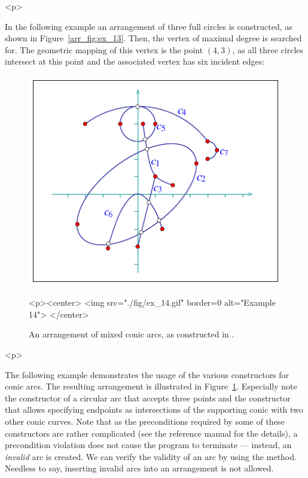 \begin{ccHtmlOnly}<p>\end{ccHtmlOnly}
In the following example an arrangement of three full circles is
constructed, as shown in Figure~\ref{arr_fig:ex_13}. Then, the vertex
of maximal degree is searched for. The geometric mapping of this
vertex is the point $(4,3)$, as all three circles intersect at this point
and the associated vertex has six incident edges:


\begin{figure}[!htp]
\begin{ccTexOnly}
  \begin{center}
  \includegraphics{Arrangement_2/fig/ex_14}
  \end{center}
\end{ccTexOnly}
\begin{ccHtmlOnly}
  <p><center>
  <img src="./fig/ex_14.gif" border=0 alt="Example 14">
  </center>
\end{ccHtmlOnly}
\caption{An arrangement of mixed conic arcs, as constructed in
.}
\label{arr_fig:ex_14}
\end{figure}

\begin{ccHtmlOnly}<p>\end{ccHtmlOnly}
The following example demonstrates the usage of the various
constructors for conic arcs. The resulting arrangement is illustrated
in Figure~\ref{arr_fig:ex_14}. Especially note the constructor of a
circular arc that accepts three points and the constructor that
allows specifying endpoints as intersections of the supporting
conic with two other conic curves. Note that as the preconditions
required by some of these constructors are rather complicated (see
the reference manual for the details), a precondition violation
does not cause the program to terminate --- instead, an {\em
invalid} arc is created. We can verify the validity of an arc by
using the  method. Needless to say, inserting
invalid arcs into an arrangement is not allowed.

